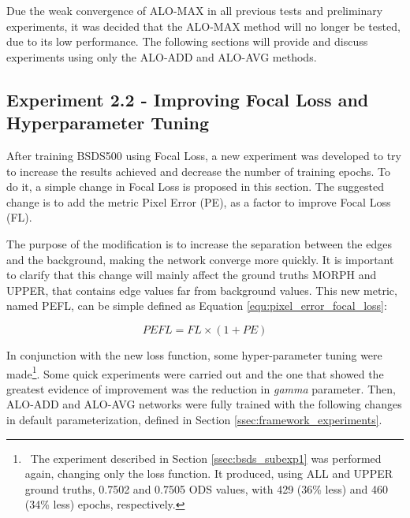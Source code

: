 
Due the weak convergence of ALO-MAX in all previous tests and preliminary experiments, it was decided that the ALO-MAX method will no longer be tested, due to its low performance.
The following sections will provide and discuss experiments using only the ALO-ADD and ALO-AVG methods.

\subsection{Experiment 2.2 - Improving Focal Loss and Hyperparameter Tuning}
\label{ssec:bsds_subexp2}

After training BSDS500 using Focal Loss, a new experiment was developed to try to increase the results achieved and decrease the number of training epochs.
To do it, a simple change in Focal Loss is proposed in this section.
The suggested change is to add the metric Pixel Error (PE), as a factor to improve Focal Loss (FL).

The purpose of the modification is to increase the separation between the edges and the background, making the network converge more quickly.
It is important to clarify that this change will mainly affect the ground truths MORPH and UPPER, that contains edge values far from background values.
This new metric, named PEFL, can be simple defined as Equation \ref{equ:pixel_error_focal_loss}:

\begin{equation}
  PEFL = FL \times (1 + PE)
  \label{equ:pixel_error_focal_loss}
\end{equation}

In conjunction with the new loss function, some hyper-parameter tuning were made\footnote{~The experiment described in Section \ref{ssec:bsds_subexp1} was performed again, changing only the loss function. It produced, using ALL and UPPER ground truths, 0.7502 and 0.7505 ODS values, with 429 (36\% less) and 460 (34\% less) epochs, respectively.}.
Some quick experiments were carried out and the one that showed the greatest evidence of improvement was the reduction in \textit{gamma} parameter.
Then, ALO-ADD and ALO-AVG networks were fully trained with the following changes in default parameterization, defined in Section \ref{ssec:framework_experiments}.

